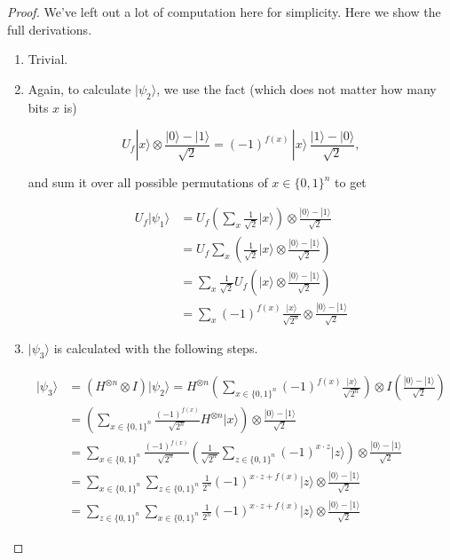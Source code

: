 \documentclass{article}
\begin{document}
    \begin{proof} 
      We've left out a lot of computation here for simplicity. Here we show the full derivations. 
      \begin{enumerate} 
        \item Trivial. 
        \item Again, to calculate $|\psi_2 \rangle$, we use the fact (which does not matter how many bits $x$ is)

          \begin{equation}
            U_f |x\rangle \otimes \frac{|0\rangle - |1\rangle}{\sqrt{2}} = (-1)^{f(x)} \,|x\rangle \, \frac{|1\rangle - |0\rangle}{\sqrt{2}},
          \end{equation}

        and sum it over all possible permutations of $x \in \{0, 1\}^n$ to get 

        \begin{align*} 
          U_f |\psi_1 \rangle & = U_f \left( \sum_x \frac{1}{\sqrt{2}} |x\rangle \right) \otimes \frac{|0\rangle - |1\rangle}{\sqrt{2}} \\
          & = U_f \sum_x \left( \frac{1}{\sqrt{2}} |x\rangle \otimes \frac{|0\rangle - |1\rangle}{\sqrt{2}}\right) \\
          & = \sum_x \frac{1}{\sqrt{2}} U_f \left( |x\rangle \otimes \frac{|0\rangle - |1\rangle}{\sqrt{2}} \right) \\
          & = \sum_x (-1)^{f(x)} \frac{|x\rangle}{\sqrt{2^n}} \otimes \frac{|0\rangle - |1\rangle}{\sqrt{2}}
        \end{align*}

        \item $|\psi_3 \rangle$ is calculated with the following steps. 

        \begin{align*} 
          |\psi_3 \rangle & = (H^{\otimes n} \otimes I) |\psi_2 \rangle = H^{\otimes n} \left( \sum_{x \in \{0, 1\}^n} (-1)^{f(x)} \frac{|x\rangle}{\sqrt{2^n}} \right) \otimes I \left( \frac{|0\rangle - |1\rangle}{\sqrt{2}} \right)\\
          & = \left( \sum_{x \in \{0, 1\}^n} \frac{(-1)^{f(x)}}{\sqrt{2^n}} H^{\otimes n} |x\rangle \right) \otimes \frac{|0\rangle - |1\rangle}{\sqrt{2}} \\
          & = \sum_{x \in \{0, 1\}^n} \frac{(-1)^{f(x)}}{\sqrt{2^n}} \left( \frac{1}{\sqrt{2^n}} \sum_{z \in \{0, 1\}^n} (-1)^{x \cdot z} |z \rangle \right) \otimes \frac{|0\rangle - |1\rangle}{\sqrt{2}} \\
          & = \sum_{x \in \{0, 1\}^n} \sum_{z \in \{0, 1\}^n} \frac{1}{2^n} (-1)^{x \cdot z + f(x)} |z\rangle \otimes \frac{|0\rangle - |1\rangle}{\sqrt{2}} \\
          & = \sum_{z \in \{0, 1\}^n} \sum_{x \in \{0, 1\}^n} \frac{1}{2^n} (-1)^{x \cdot z + f(x)} |z\rangle \otimes \frac{|0\rangle - |1\rangle}{\sqrt{2}}
        \end{align*}
      \end{enumerate}
    \end{proof}
\end{document}
